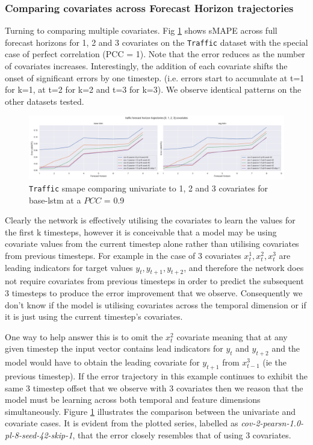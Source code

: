 \documentclass{article}
\newcommand{\pearson}{PCC}
\begin{document}
\subsubsection{Comparing covariates across Forecast Horizon trajectories}
Turning to comparing multiple covariates. Fig \ref{fig:lstm_traffic_univariate_vs_covariate} shows sMAPE across full forecast horizons for 1, 2 and 3 covariates on 
the \texttt{Traffic} dataset with the special case of perfect correlation (PCC = 1). Note that the error reduces as the number of covariates increases. 
Interestingly, the addition of each covariate shifts the onset of significant errors by one timestep. (i.e. errors start to accumulate at t=1 for k=1, 
at t=2 for k=2 and t=3 for k=3). We observe identical patterns on the other datasets tested.
\begin{figure}[ht]
\centering
\includegraphics[width=1.\textwidth]{figures/models_traf_k.png}
\caption{\texttt{Traffic} smape comparing univariate to 1, 2 and 3 covariates for base-lstm at a $\pearson$ = 0.9}
\label{fig:lstm_traffic_univariate_vs_covariate}
\end{figure}
Clearly the network is effectively utilising the covariates to learn the values for the first k timesteps, however it is conceivable that a model may be using covariate 
values from the current timestep alone rather than utilising covariates from previous timesteps. For example in the case of 3 covariates  ${x_t^1, x_t^2, x_t^3}$ 
are leading indicators for target values ${y_t, y_{t+1}, y_{t+2}}$, and therefore the network does not require covariates from previous timesteps in order to predict the subsequent 
3 timesteps to produce the error improvement that we observe. Consequently we don't know if the model is utilising covariates across the temporal dimension 
or if it is just using the current timestep's covariates.

One way to help answer this is to omit the $x_t^2$ covariate meaning that at any given timestep the input vector contains lead indicators for $y_t$ and $y_{t+2}$ and the model 
would have to obtain the leading covariate for $y_{t+1}$ from $x^3_{t-1}$ (ie the previous timestep). If the error trajectory in this example continues to exhibit the same 3 timestep 
offset that we observe with 3 covariates then we reason that the model must be learning across both temporal and feature dimensions simultaneously.
Figure \ref{fig:lstm_traffic_univariate_vs_covariate} illustrates the comparison between the univariate and covariate cases. 
It is evident from the plotted series, labelled as \textit{cov-2-pearsn-1.0-pl-8-seed-42-skip-1}, that the error closely resembles that of using 3 covariates.
\end{document}
